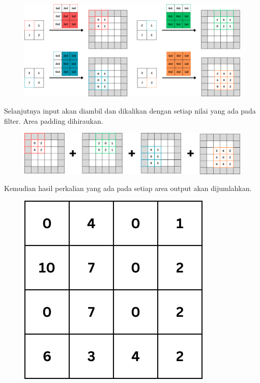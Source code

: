 \begin{figure}[H]
	\centering
	\includegraphics[scale=.2]{gambar/lampiran/dekonv-full.png}
\end{figure}

Selanjutnya input akan diambil dan dikalikan dengan setiap nilai yang ada pada filter. Area padding dihiraukan.

\begin{figure}[H]
	\centering
	\includegraphics[scale=.2]{gambar/lampiran/dekonv-7.png}
\end{figure}

Kemudian hasil perkalian yang ada pada setiap area output akan dijumlahkan.

\begin{figure}[H]
	\centering
	\includegraphics[scale=.4]{gambar/lampiran/dekonv-8.png}
\end{figure}


